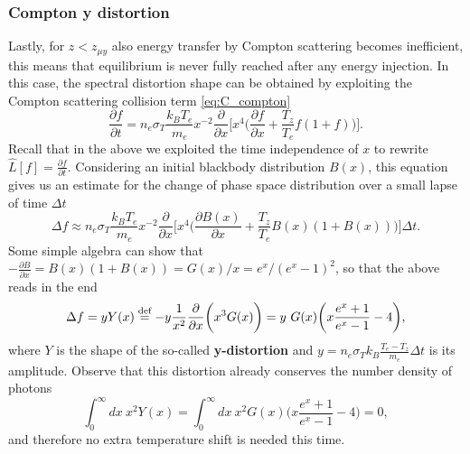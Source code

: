 \subsubsection{Compton y distortion}
Lastly, for $z<z_{\mu y}$ also energy transfer by Compton scattering becomes inefficient, this means that equilibrium is never fully reached after any energy injection. In this case, the spectral distortion shape can be obtained by exploiting the Compton scattering collision term \eqref{eq:C_compton}
$$\frac{\partial f}{\partial t}=n_e\sigma_T\frac{k_BT_e}{m_e}x^{-2}\frac{\partial}{\partial x}\bigg[x^4\bigg(\frac{\partial f}{\partial x}+\frac{T_z}{T_e}f(1+f)\bigg)\bigg].$$ Recall that in the above we exploited the time independence of $x$ to rewrite $\hat{L}[f]=\frac{\partial f}{\partial t}.$
Considering an initial blackbody distribution $B(x)$, this equation gives us an estimate for the change of phase space distribution over a small lapse of time $\Delta t$ $$\Delta f\approx n_e\sigma_T\frac{k_BT_e}{m_e}x^{-2}\frac{\partial}{\partial x}\bigg[x^4\bigg(\frac{\partial B(x)}{\partial x}+\frac{T_z}{T_e}B(x)(1+B(x))\bigg)\bigg]\Delta t.$$
Some simple algebra can show that $-\frac{\partial B}{\partial x}=B(x)(1+B(x))={G(x)}/{x}={e^x}/{(e^x-1)^2}$, so that the above reads in the end
\begin{equation}
    \label{eq:SD_y_distortion}
    \Delta f=yY(x)\defeq -y\frac{1}{x^2}\frac{\partial}{\partial x}\bigg(x^3G(x)\bigg)=y\ G(x)\bigg(x\frac{e^x+1}{e^x-1}-4\bigg),
\end{equation}
where $Y$ is the shape of the so-called \textbf{y-distortion} and $y=n_e\sigma_Tk_B\frac{T_e-T_z}{m_e}\Delta t$ is its amplitude. Observe that this distortion already conserves the number density of photons
$$\int_0^\infty dx\ x^2Y(x)=\int_0^\infty dx\ x^2G(x)\bigg(x\frac{e^x+1}{e^x-1}-4\bigg)=0,$$
and therefore no extra temperature shift is needed this time.

